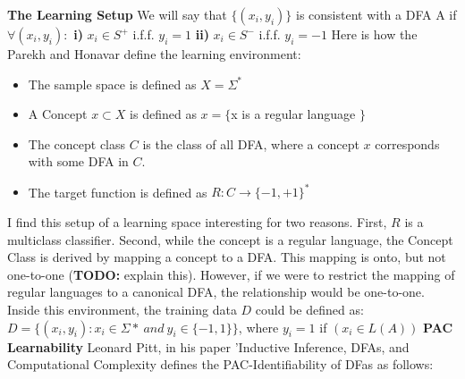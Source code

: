 \documentclass[10pt,a4paper]{report}
\begin{document}
\newpage
\noindent
\textbf{The Learning Setup}
\newline
\newline
\newline
We will say that $\{ (x_i, y_i) \}$ is consistent with a DFA A if $\forall (x_i, y_i):$
\newline
\newline \indent \indent \textbf{i)} $x_i \in S^+$ i.f.f. $y_i = 1$
\newline \indent \indent \textbf{ii)} $x_i \in S^-$ i.f.f. $y_i = -1$
\newline
\newline
Here is how the Parekh and Honavar define the learning environment:
\begin{itemize}
	\item The sample space is defined as $X = \Sigma^*$ 
	\item A Concept $x \subset X$ is defined as  $x = \{ $x is a regular language $\}$
	\item The concept class $C$ is the class of all DFA, where a concept $x$ corresponds with some DFA in $C$.
	\item The target function is defined as $R:C \rightarrow \{-1, +1\}^*$
\end{itemize}
\indent
\newline
\indent
I find this setup of a learning space interesting for two reasons. First, $R$ is a multiclass classifier. Second, while the concept is a regular language, the Concept Class is derived by mapping a concept to a DFA. This mapping is onto, but not one-to-one (\textbf{TODO:} explain this). However, if we were to restrict the mapping of regular languages to a canonical DFA, the relationship would be one-to-one.
\newline
\newline
Inside this environment, the training data $D$ could be defined as:
\newline\newline\indent
$D = \{ (x_i, y_i): x_i \in \Sigma* \ and \ y_i \in \{-1, 1\} \}$, where $y_i = 1$ if $(x_i \in L(A))$
\newline\newline
\textbf{PAC Learnability}
\newline
\newline
\indent
Leonard Pitt, in his paper 'Inductive Inference, DFAs, and Computational Complexity defines the PAC-Identifiability of DFas as follows:
\newline\newline\indent
\end{document}
